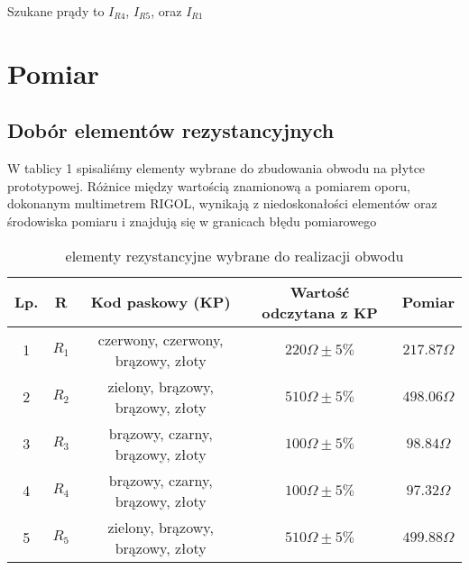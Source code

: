 \documentclass[polish,a4paper]{article}
\begin{document}
Szukane prądy to $I_{R4}$, $I_{R5}$, oraz $I_{R1}$ 

\pagebreak
\section{Pomiar}
\subsection{Dobór elementów rezystancyjnych}

W tablicy 1 spisaliśmy elementy wybrane do zbudowania obwodu na płytce prototypowej. Różnice między wartością znamionową a pomiarem oporu, dokonanym multimetrem RIGOL, wynikają z niedoskonałości elementów oraz środowiska pomiaru i znajdują się w granicach błędu pomiarowego
\begin{table}[H]
\centering
\begin{tabular}{|c|c|c|c|c|}
\hline
 Lp.& R & Kod\hspace{0.1cm} paskowy (KP) & Wartość\hspace{0.1cm} odczytana\hspace{0.1cm} z\hspace{0.1cm} KP & Pomiar\\
\hline 
1 & $R_{1}$ & czerwony, czerwony, brązowy, złoty & $220\Omega\pm 5\%$ & $217.87\Omega$\\
\hline
2&$R_{2}$& zielony, brązowy, brązowy, złoty & $510\Omega\pm 5\%$ & $498.06\Omega$ \\
\hline
3 & $R_{3}$& brązowy, czarny, brązowy, złoty&$100\Omega\pm 5\%$ & $98.84\Omega$\\
\hline
4 & $R_{4}$& brązowy, czarny, brązowy, złoty&$100\Omega\pm 5\%$ & $97.32\Omega$\\
\hline
5 & $R_{5}$& zielony, brązowy, brązowy, złoty & $510\Omega\pm 5\%$ & $499.88\Omega$ \\
\hline
\end{tabular}
\caption{elementy rezystancyjne wybrane do realizacji obwodu}
\end{table}
\end{document}
